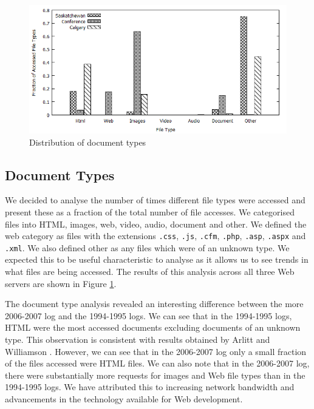 \documentclass[10pt,conference]{IEEEtran}
\begin{document}
\begin{figure}
    \includegraphics{images/filetype}
    \caption{Distribution of document types}\label{fig:file_types}
\end{figure}

\subsection{Document Types}\label{sub:doc_types}
We decided to analyse the number of times different file types were accessed and present these as a fraction of the total number of file accesses. We categorised files into HTML, images, web, video, audio, document and other. We defined the web category as files with the extensions \texttt{.css}, \texttt{.js}, \texttt{.cfm}, \texttt{.php}, \texttt{.asp}, \texttt{.aspx} and \texttt{.xml}. We also defined other as any files which were of an unknown type. We expected this to be useful characteristic to analyse as it allows us to see trends in what files are being accessed. The results of this analysis across all three Web servers are shown in Figure \ref{fig:file_types}.

The document type analysis revealed an interesting difference between the more 2006-2007 log and the 1994-1995 logs. We can see that in the 1994-1995 logs, HTML were the most accessed documents excluding documents of an unknown type. This observation is consistent with results obtained by Arlitt and Williamson \cite{keynote}. However, we can see that in the 2006-2007 log only a small fraction of the files accessed were HTML files. We can also note that in the 2006-2007 log, there were substantially more requests for images and Web file types than in the 1994-1995 logs. We have attributed this to increasing network bandwidth and advancements in the technology available for Web development.
\end{document}
